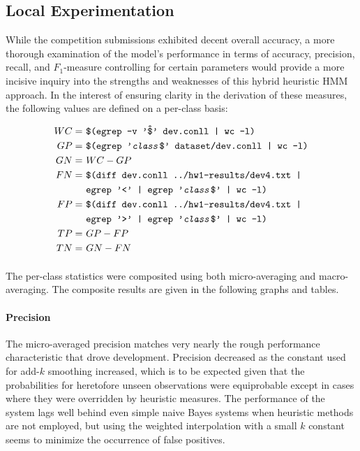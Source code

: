 \documentclass[11pt,a4paper]{article}
\begin{document}
\subsection{Local Experimentation}
While the competition submissions exhibited decent overall accuracy,
a more thorough examination of the model's performance in
terms of accuracy, precision, recall, and $F_{1}$-measure \cite[83-84]{JurafskyMartin}
controlling for certain parameters would provide a more incisive inquiry
into the strengths and weaknesses of this hybrid heuristic HMM approach.
In the interest of ensuring clarity in the derivation of these measures,
the following values are defined on a per-class basis:

{\tiny
\begin{align*}{}
  WC =&\ \texttt{\$(egrep -v '\^\$' dev.conll | wc -l)} \\
  GP =&\ \texttt{\$(egrep '\emph{class}\$' dataset/dev.conll | wc -l)} \\
  GN =&\ WC - GP \\
  FN =&\ \texttt{\$(diff dev.conll ../hw1-results/dev4.txt | } \\
     &\  \texttt{egrep '<' | egrep '\emph{class}\$' | wc -l)} \\
  FP =&\ \texttt{\$(diff dev.conll ../hw1-results/dev4.txt | } \\
     &\  \texttt{egrep '>' | egrep '\emph{class}\$' | wc -l)} \\
  TP =&\ GP - FP \\
  TN =&\ GN - FN
\end{align*}}

\paragraph{}
The per-class statistics were composited using both micro-averaging
and macro-averaging. The composite results are given in the
following graphs and tables.

\paragraph{Precision}
The micro-averaged precision matches very nearly the rough performance
characteristic that drove development. Precision decreased as
the constant used for add-$k$ smoothing increased, which is to be
expected given that the probabilities for heretofore unseen
observations were equiprobable except in cases where they were
overridden by heuristic measures. The performance of the system
lags well behind even simple naive Bayes systems when heuristic
methods are not employed, but using the weighted interpolation
with a small $k$ constant seems to minimize the occurrence of
false positives.
\end{document}
